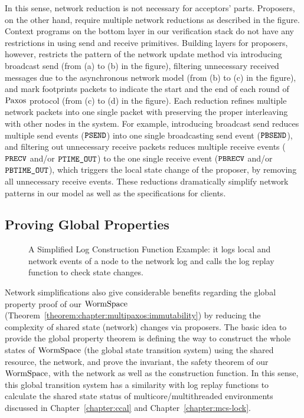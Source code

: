 In this sense, 
network reduction is not necessary for acceptors' parts. 
Proposers, on the other hand, require multiple network reductions as described in the figure. 
Context programs on the bottom layer in our verification stack do not have any restrictions in using send and receive primitives.
Building layers for proposers,  however, 
restricts the pattern of the network update method 
via introducing broadcast send (from (a) to (b) in the figure), 
filtering unnecessary received messages due to the asynchronous  network model (from (b) to (c) in the figure),
and mark footprints packets to indicate the start and the end of each round of $\mathrm{Paxos}$ protocol (from (c) to (d) in the figure).
Each reduction refines multiple network packets into one single packet with preserving the proper interleaving with other nodes in the system. 
For example, 
introducing broadcast send reduces multiple send events (${\mathrm{\texttt{PSEND}}}$) into one single broadcasting send event (${\mathrm{\texttt{PBSEND}}}$),
and filtering out unnecessary receive packets reduces multiple receive events (${\mathrm{\texttt{PRECV}}}$ and/or ${\mathrm{\texttt{PTIME\_OUT}}}$) 
to the one single receive event (${\mathrm{\texttt{PBRECV}}}$ and/or ${\mathrm{\texttt{PBTIME\_OUT}}}$), which triggers the local state change of the proposer,
by removing all unnecessary receive events. 
These reductions dramatically simplify network patterns in our model as well as the specifications for clients. 


\subsection{Proving Global Properties}
\label{subsec:safety_verification}

\begin{figure}

\caption{A Simplified Log Construction Function Example: it logs local and network events of a node to the network log and calls the log replay function to check state changes.}
\label{fig:chapter:multipaxos:spec}
\end{figure}


Network simplifications also give considerable benefits regarding the global property proof of our $\mathrm{WormSpace}$ (Theorem~\ref{theorem:chapter:multipaxos:immutability}) by reducing the complexity of 
shared state (network) changes via proposers.
The basic idea to provide the global property theorem is defining the way to construct the whole states of $\mathrm{WormSpace}$ (the global state transition system) using the shared resource, the network, and prove the invariant, the safety theorem of our $\mathrm{WormSpace}$, with the network as well as the construction function.  
In this sense, this global transition system has a similarity with log replay functions to calculate the shared state status of 
multicore/multithreaded environments discussed in Chapter~\ref{chapter:ccal} and Chapter~\ref{chapter:mcs-lock}.

